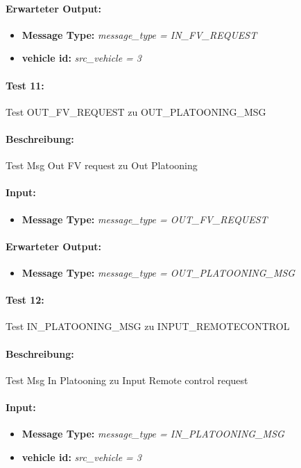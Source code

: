 \documentclass[a4paper, 12pt, titlepage]{scrartcl}
\begin{document}
{			\paragraph{Erwarteter Output:}
			\begin{itemize} \itemsep-0.5em
				\item \textbf{Message Type:} \emph{message\_type = IN\_FV\_REQUEST}
				\item \textbf{vehicle id:} \emph{src\_vehicle = 3}
			\end{itemize}

			\paragraph{Test 11:}{Test OUT\_FV\_REQUEST zu OUT\_PLATOONING\_MSG}
			\paragraph{Beschreibung:} Test Msg Out FV request zu Out Platooning
			\paragraph{Input:}
			\begin{itemize} \itemsep-0.5em
				\item \textbf{Message Type:} \emph{message\_type = OUT\_FV\_REQUEST}
			\end{itemize}
			\paragraph{Erwarteter Output:}
			\begin{itemize} \itemsep-0.5em
				\item \textbf{Message Type:} \emph{message\_type = OUT\_PLATOONING\_MSG}
			\end{itemize}	
			
			\paragraph{Test 12:}{Test IN\_PLATOONING\_MSG zu INPUT\_REMOTECONTROL}
			\paragraph{Beschreibung:} Test Msg In Platooning zu Input Remote control request
			\paragraph{Input:}
			\begin{itemize} \itemsep-0.5em
				\item \textbf{Message Type:} \emph{message\_type = IN\_PLATOONING\_MSG}
				\item \textbf{vehicle id:} \emph{src\_vehicle = 3}
			\end{itemize}
}
\end{document}
